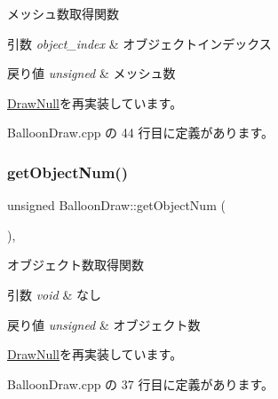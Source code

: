 メッシュ数取得関数 


\begin{DoxyParams}{引数}
{\em object\+\_\+index} & オブジェクトインデックス \\
\hline
\end{DoxyParams}

\begin{DoxyRetVals}{戻り値}
{\em unsigned} & メッシュ数 \\
\hline
\end{DoxyRetVals}


\mbox{\hyperlink{class_draw_null_a4c566a37d27fac3dcf76c7970443f375}{Draw\+Null}}を再実装しています。



 Balloon\+Draw.\+cpp の 44 行目に定義があります。

\mbox{\label{class_balloon_draw_a979518a6cc85aa355f680336953b5e46}} 
\subsubsection{\texorpdfstring{get\+Object\+Num()}{getObjectNum()}}
{\footnotesize\ttfamily unsigned Balloon\+Draw\+::get\+Object\+Num (\begin{DoxyParamCaption}{ }\end{DoxyParamCaption})\hspace{0.3cm}{\ttfamily [override]}, {\ttfamily [virtual]}}



オブジェクト数取得関数 


\begin{DoxyParams}{引数}
{\em void} & なし \\
\hline
\end{DoxyParams}

\begin{DoxyRetVals}{戻り値}
{\em unsigned} & オブジェクト数 \\
\hline
\end{DoxyRetVals}


\mbox{\hyperlink{class_draw_null_a8bddfa6ee87e47b2ecbbe6803b088e37}{Draw\+Null}}を再実装しています。



 Balloon\+Draw.\+cpp の 37 行目に定義があります。

\mbox{\label{class_balloon_draw_aa84c8479ee1a6e95376b7fc0c82e5173}} 
